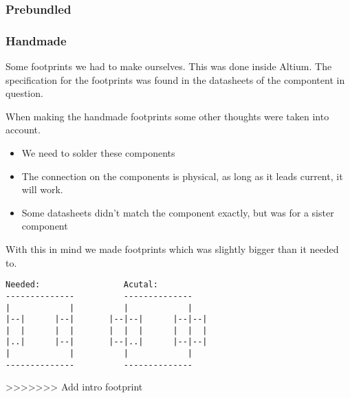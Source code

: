 


\subsubsection{Prebundled}

\subsubsection{Handmade}
Some footprints we had to make ourselves.
This was done inside Altium.
The specification for the footprints was found in the datasheets of the compontent in question.

When making the handmade footprints some other thoughts were taken into account.

\begin{itemize}
    \item We need to solder these components
    \item The connection on the components is physical, as long as it leads current, it will work.
    \item Some datasheets didn't match the component exactly, but was for a sister component
\end{itemize}

With this in mind we made footprints which was slightly bigger than it needed to.

\begin{verbatim}
Needed:                 Acutal:
--------------          --------------
|            |          |            |
|--|      |--|       |--|--|      |--|--|
|  |      |  |       |  |  |      |  |  |
|..|      |--|       |--|..|      |--|--|
|            |          |            |
--------------          --------------
\end{verbatim}
>>>>>>> Add intro footprint

